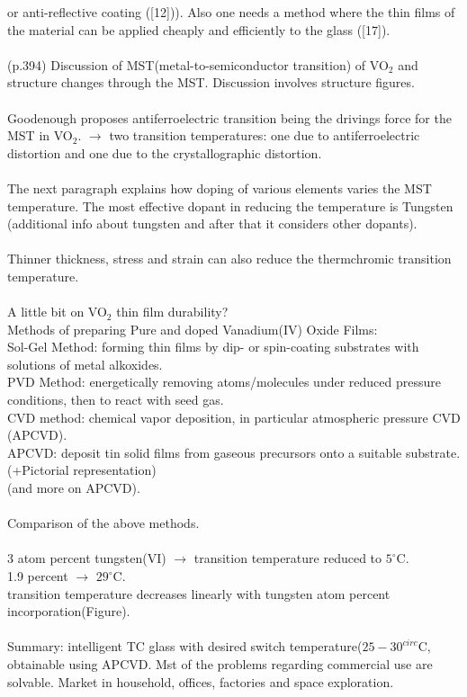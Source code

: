 or anti-reflective coating ([12])). Also one needs a method where the thin films of the material
can be applied cheaply and efficiently to the glass ([17]).\\
\\
(p.394) Discussion of MST(metal-to-semiconductor transition) of VO$_2$ and structure 
changes through the MST. Discussion involves structure figures.\\
\\
Goodenough proposes antiferroelectric transition being the drivings force
for the MST in VO$_2$. $\rightarrow$ two transition temperatures: one due to antiferroelectric
distortion and one due to the crystallographic distortion. \\
\\
The next paragraph explains how doping of various elements varies the MST temperature. 
The most effective dopant in reducing the temperature is Tungsten (additional info about tungsten 
and after that it considers other dopants). \\
\\
Thinner thickness, stress and strain can also reduce the thermchromic transition temperature.\\
\\
A little bit on VO$_2$ thin film durability? \\
Methods of preparing Pure  and doped Vanadium(IV) Oxide Films:\\ 
Sol-Gel Method: forming thin films by dip- or spin-coating substrates with solutions of metal alkoxides. \\
PVD Method: energetically removing atoms/molecules under reduced pressure conditions, then to react with seed gas. \\ 
CVD method: chemical vapor deposition, in particular atmospheric pressure CVD (APCVD). \\
APCVD: deposit tin solid films from gaseous precursors onto a suitable substrate. (+Pictorial representation)\\
(and more on APCVD).\\
\\
Comparison of the above methods. \\
\\
3 atom percent tungsten(VI) $\rightarrow$ transition temperature reduced to $5^{\circ}$C.\\
1.9 percent $\rightarrow$ $29^{\circ}$C.\\
transition temperature decreases linearly with tungsten atom percent incorporation(Figure). \\
\\
Summary: intelligent TC glass with desired switch temperature($25-30^{circ}$C, obtainable using APCVD.
Mst of the problems regarding commercial use are solvable. Market in household, offices, factories and space
exploration.\\


